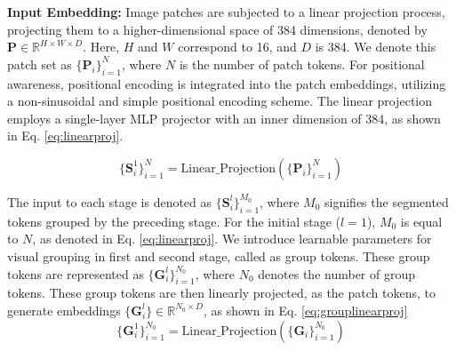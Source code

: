 \textbf{Input Embedding:} 
Image patches are subjected to a linear projection process, projecting them to a higher-dimensional space of 384 dimensions, denoted by $\textbf{P} \in \mathbb{R}^{H \times W \times D}$. Here, $H$ and $W$ correspond to 16, and $D$ is 384. We denote this patch set as $\{\textbf{P}_i\}_{i=1}^{N}$, where $N$ is the number of patch tokens. For positional awareness, positional encoding is integrated into the patch embeddings, utilizing a non-sinusoidal and simple positional encoding scheme. The linear projection employs a single-layer MLP projector with an inner dimension of 384, as shown in Eq. \ref{eq:linearproj}.

\begin{equation}
\label{eq:linearproj}
\{\textbf{S}_i^{1}\}_{i=1}^{N} = \text{Linear\_Projection}(\{\textbf{P}_i\}_{i=1}^{N})
\end{equation}

The input to each stage is denoted as $\{\textbf{S}_i^{l}\}_{i=1}^{M_0}$, where $M_0$ signifies the segmented tokens grouped by the preceding stage. For the initial stage ($l=1$), $M_0$ is equal to  $N$,  as denoted in Eq. \ref{eq:linearproj}. We introduce learnable parameters for visual grouping in first and second stage, called as group tokens. These group tokens are represented as $\{\textbf{G}_i^{l}\}_{i=1}^{N_0}$, where $N_0$ denotes the number of group tokens. These group tokens are then linearly projected, as the patch tokens, to generate embeddings $\{\textbf{G}_i^{l}\} \in \mathbb{R}^{N_0\times D}$, as shown in Eq. \ref{eq:grouplinearproj}
\begin{equation}
\label{eq:grouplinearproj}
\{\textbf{G}_i^{1}\}_{i=1}^{N_0} = \text{Linear\_Projection}(\{\textbf{G}_i\}_{i=1}^{N_0})
\end{equation}

